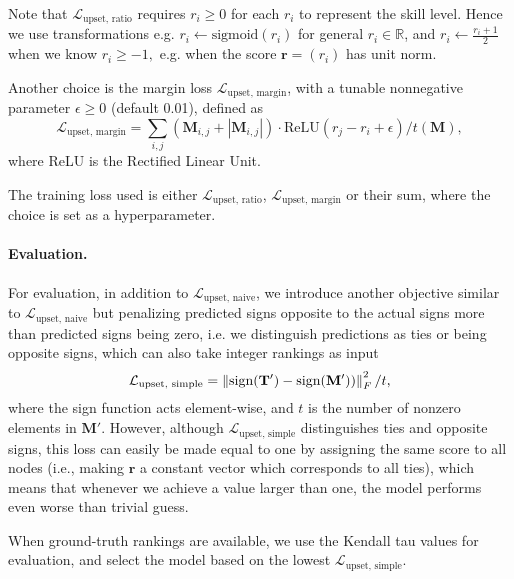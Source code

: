 \documentclass[nohyperref]{article}
\theoremstyle{plain}
\theoremstyle{definition}
\theoremstyle{remark}
\begin{document}
Note that $\mathcal{L}_\text{upset, ratio}$ requires $r_i\geq 0$ for each $r_i$ to represent the skill level. Hence we use transformations e.g. $r_i \leftarrow \text{sigmoid}(r_i)$ for general $r_i\in\mathbb{R}$,  and $r_i \leftarrow \frac{r_i+1}{2}$ when we know $r_i\geq -1,$ e.g. when the score  $\mathbf{r}=(r_i)$ has unit norm. 

Another choice is the margin loss $\mathcal{L}_\text{upset, margin}$, with a tunable nonnegative parameter $\epsilon\geq 0$ (default 0.01), defined as 
\begin{equation}
    \mathcal{L}_\text{upset, margin} = \sum_{i, j}(\mathbf{M}_{i,j}+|\mathbf{M}_{i,j}|)\cdot \text{ReLU}(r_j - r_i + \epsilon)/t(\mathbf{M}), \label{eq:loss_margin}
\end{equation}
where
ReLU is the Rectified Linear Unit.

The training loss used is either $\mathcal{L}_\text{upset, ratio}$, $\mathcal{L}_\text{upset, margin}$ or their sum, where the choice is set as a hyperparameter.

\vspace{-3mm} 
\paragraph{Evaluation.}For evaluation, in addition to $\mathcal{L}_\text{upset, naive}$, we introduce another objective similar to $\mathcal{L}_\text{upset, naive}$ but penalizing predicted signs opposite to the actual signs more than predicted signs being zero, i.e. we distinguish predictions as ties or being opposite signs, which can also take integer rankings as input
\begin{equation}
\vspace{-1mm}
    \mathcal{L}_\text{upset, simple} =
    \left\lVert \text{sign}(\mathbf{T'})- \text{sign}(\mathbf{M'})) \right\rVert^2_F/t,
    \label{eq:loss_upset_simple}
\end{equation}
where the sign function acts element-wise, 
and $t$ is the number of nonzero elements in $\mathbf{M}'.$ However, although $\mathcal{L}_\text{upset, simple}$ distinguishes ties and opposite signs, this loss 
can easily be made equal to one by assigning the same score to all nodes (i.e., making $\mathbf{r}$ a constant vector which corresponds to all ties), which means that whenever we achieve a value larger than one, the model performs even worse than trivial guess.

When ground-truth rankings are available, we use the Kendall tau \cite{brandenburg2013comparing} values for evaluation, and select the model based on the lowest $\mathcal{L}_\text{upset, simple}$.
\end{document}
